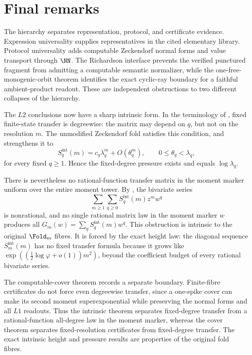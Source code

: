 \section{Final remarks}\label{sec:discussion}

The hierarchy separates representation, protocol, and certificate evidence.
Expression universality supplies representatives in the cited elementary
library.  Protocol universality adds computable Zeckendorf normal forms and
value transport through \(\NN\).  The Richardson interface prevents the
verified punctured fragment from admitting a computable semantic normalizer,
while the one-free-monogenic-orbit theorem identifies the exact cyclic-ray
boundary for a faithful ambient-product readout.  These are independent
obstructions to two different collapses of the hierarchy.

The \(L2\) conclusions now have a sharp intrinsic form.  In the terminology of
, fixed finite-state transfer
is degreewise: the matrix may depend on \(q\), but not on the resolution \(m\).
The unmodified Zeckendorf fold satisfies this condition, and
 strengthens it to
\[
  S_q^{\mathrm{int}}(m)
  =c_q\lambda_q^m+O(\theta_q^m),
  \qquad 0\le\theta_q<\lambda_q ,
\]
for every fixed \(q\ge1\).  Hence the fixed-degree pressure exists and equals
\(\log\lambda_q\).

There is nevertheless no rational-function transfer matrix in the moment marker
uniform over the entire moment tower.
By , the bivariate series
\[
  \sum_{m\ge1}\sum_{q\ge0}S_q^{\mathrm{int}}(m)z^mw^q
\]
is nonrational, and no single rational matrix law in the moment marker \(w\)
produces all \(G_m(w)=\sum_qS_q^{\mathrm{int}}(m)w^q\).  This obstruction is
intrinsic to the original \(\Fold_m\) fibres.  It is forced by the exact height
law: the diagonal sequence \(S_m^{\mathrm{int}}(m)\) has no fixed transfer
formula because it grows like
\(\exp((\frac12\log\varphi+o(1))m^2)\), beyond the coefficient budget of every
rational bivariate series.

The computable-cover theorem records a separate boundary.  Finite-fibre
certificates do not force even degreewise transfer, since a one-spike cover can
make its second moment superexponential while preserving the normal forms and
all \(L1\) readouts.  Thus the intrinsic theorem separates fixed-degree transfer
from a rational-function all-degree law in the moment marker, whereas the cover
theorem separates fixed-resolution certificates from fixed-degree transfer.  The
exact intrinsic height and pressure results are properties of the original fold
fibres.

